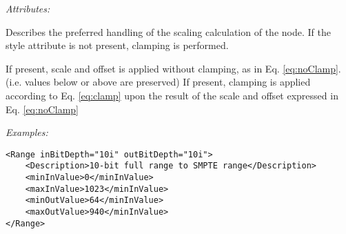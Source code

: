 \emph{Attributes:}
\begin{xmlfields}
    \xmlitem[style][optional]
        Describes the preferred handling of the scaling calculation of the  node. If the style attribute is not present, clamping is performed.
        \begin{xmlfields}
            \xmlitemd["noClamp"] If present, scale and offset is applied without clamping, as in Eq. \ref{eq:noClamp}. \\
            (i.e. values below  or above  are preserved) 
            \xmlitemd["Clamp"] If present, clamping is applied according to Eq. \ref{eq:clamp} upon the result of the scale and offset expressed in  Eq. \ref{eq:noClamp}
        \end{xmlfields}
\end{xmlfields}

\emph{Examples:}
\begin{lstlisting}[caption=Using \xml{"Range"} for scaling 10-bit full range to 10-bit SMPTE (legal) range.]
<Range inBitDepth="10i" outBitDepth="10i">
    <Description>10-bit full range to SMPTE range</Description>
    <minInValue>0</minInValue>
    <maxInValue>1023</minInValue>
    <minOutValue>64</minInValue>
    <maxOutValue>940</minInValue>
</Range>
\end{lstlisting}